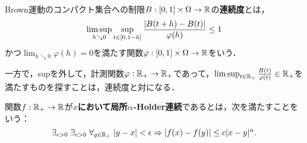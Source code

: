 \documentclass[uplatex,dvipdfmx]{jsreport}
\begin{document}
\begin{definition}
    Brown運動のコンパクト集合への制限$B:[0,1]\times\Omega\to\mathbb{R}$の\textbf{連続度}とは，
    \[\limsup_{h\searrow 0}\sup_{t\in[0,1-h]}\frac{\lvert B(t+h)-B(t)\rvert}{\varphi(h)}\le 1\]
    かつ$\lim_{h\searrow0}\varphi(h)=0$を満たす関数$\varphi:[0,1]\times\Omega\to\mathbb{R}$をいう．
\end{definition}
\begin{remark}
    一方で，supを外して，計測関数$\varphi:\mathbb{R}_+\to\mathbb{R}_+$であって，$\limsup_{t\in\mathbb{R}_+}\frac{B(t)}{\varphi(t)}\in\mathbb{R}_+$を満たすものを探すことは，連続度と対になる．
\end{remark}

\begin{definition}
    関数$f:\mathbb{R}_+\to\mathbb{R}$が\textbf{$x$において局所$\alpha$-Holder連続}であるとは，次を満たすことをいう：
    \[\exists_{\epsilon>0}\;\exists_{c>0}\;\forall_{y\in\mathbb{R}_+}\;\lvert y-x\rvert<\epsilon\Rightarrow\lvert f(x)-f(y)\rvert\le c\lvert x-y\rvert^\alpha.\]
\end{definition}
\end{document}
